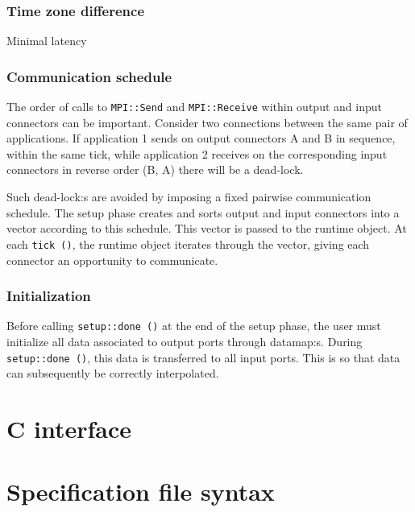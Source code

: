 \documentclass[a4paper]{report}
\begin{document}
\subsection{Time zone difference}

Minimal latency

\subsection{Communication schedule}

The order of calls to \verb|MPI::Send| and \verb|MPI::Receive| within
output and input connectors can be important.  Consider two
connections between the same pair of applications.  If application 1
sends on output connectors A and B in sequence, within the same tick,
while application 2 receives on the corresponding input connectors in
reverse order (B, A) there will be a dead-lock.

Such dead-lock:s are avoided by imposing a fixed pairwise
communication schedule.  The setup phase creates and sorts output and
input connectors into a vector according to this schedule.  This
vector is passed to the runtime object.  At each \verb|tick ()|, the
runtime object iterates through the vector, giving each connector an
opportunity to communicate.

\subsection{Initialization}

Before calling \verb|setup::done ()| at the end of the setup phase,
the user must initialize all data associated to output ports through
datamap:s.  During \verb|setup::done ()|, this data is transferred to
all input ports.  This is so that data can subsequently be correctly
interpolated.

\appendix

\chapter{C interface}

\chapter{Specification file syntax}

\newcommand{\nt}[1]{$<$#1$>$}
\end{document}
